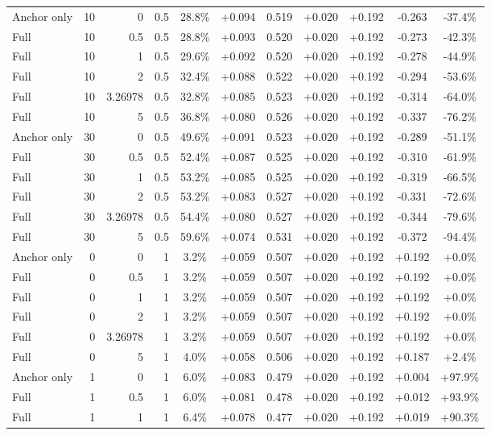 \begin{table}[htbp]
\begin{tabular}{lrrrccccccc}
Anchor only & 10 & 0 & 0.5 & 28.8\% & +0.094 & 0.519 & +0.020 & +0.192 & -0.263 & -37.4\% \\
Full & 10 & 0.5 & 0.5 & 28.8\% & +0.093 & 0.520 & +0.020 & +0.192 & -0.273 & -42.3\% \\
Full & 10 & 1 & 0.5 & 29.6\% & +0.092 & 0.520 & +0.020 & +0.192 & -0.278 & -44.9\% \\
Full & 10 & 2 & 0.5 & 32.4\% & +0.088 & 0.522 & +0.020 & +0.192 & -0.294 & -53.6\% \\
Full & 10 & 3.26978 & 0.5 & 32.8\% & +0.085 & 0.523 & +0.020 & +0.192 & -0.314 & -64.0\% \\
Full & 10 & 5 & 0.5 & 36.8\% & +0.080 & 0.526 & +0.020 & +0.192 & -0.337 & -76.2\% \\
Anchor only & 30 & 0 & 0.5 & 49.6\% & +0.091 & 0.523 & +0.020 & +0.192 & -0.289 & -51.1\% \\
Full & 30 & 0.5 & 0.5 & 52.4\% & +0.087 & 0.525 & +0.020 & +0.192 & -0.310 & -61.9\% \\
Full & 30 & 1 & 0.5 & 53.2\% & +0.085 & 0.525 & +0.020 & +0.192 & -0.319 & -66.5\% \\
Full & 30 & 2 & 0.5 & 53.2\% & +0.083 & 0.527 & +0.020 & +0.192 & -0.331 & -72.6\% \\
Full & 30 & 3.26978 & 0.5 & 54.4\% & +0.080 & 0.527 & +0.020 & +0.192 & -0.344 & -79.6\% \\
Full & 30 & 5 & 0.5 & 59.6\% & +0.074 & 0.531 & +0.020 & +0.192 & -0.372 & -94.4\% \\
Anchor only & 0 & 0 & 1 & 3.2\% & +0.059 & 0.507 & +0.020 & +0.192 & +0.192 & +0.0\% \\
Full & 0 & 0.5 & 1 & 3.2\% & +0.059 & 0.507 & +0.020 & +0.192 & +0.192 & +0.0\% \\
Full & 0 & 1 & 1 & 3.2\% & +0.059 & 0.507 & +0.020 & +0.192 & +0.192 & +0.0\% \\
Full & 0 & 2 & 1 & 3.2\% & +0.059 & 0.507 & +0.020 & +0.192 & +0.192 & +0.0\% \\
Full & 0 & 3.26978 & 1 & 3.2\% & +0.059 & 0.507 & +0.020 & +0.192 & +0.192 & +0.0\% \\
Full & 0 & 5 & 1 & 4.0\% & +0.058 & 0.506 & +0.020 & +0.192 & +0.187 & +2.4\% \\
Anchor only & 1 & 0 & 1 & 6.0\% & +0.083 & 0.479 & +0.020 & +0.192 & +0.004 & +97.9\% \\
Full & 1 & 0.5 & 1 & 6.0\% & +0.081 & 0.478 & +0.020 & +0.192 & +0.012 & +93.9\% \\
Full & 1 & 1 & 1 & 6.4\% & +0.078 & 0.477 & +0.020 & +0.192 & +0.019 & +90.3\% \\

\end{tabular}
\end{table}
